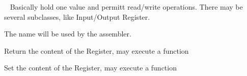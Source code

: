 \documentclass[letterpaper,10pt,english]{sphinxmanual}
\begin{document}
\begin{fulllineitems}
\label{core:py_register_machine2.core.parts.Register}~\label{core:register}
Basically hold one value and permitt read/write operations.
There may be several subclasses, like Input/Output Register.

The name will be used by the assembler.

\begin{fulllineitems}
\label{core:py_register_machine2.core.parts.Register.read}
Return the content of the Register,
may execute a function

\end{fulllineitems}


\begin{fulllineitems}
\label{core:py_register_machine2.core.parts.Register.write}
Set the content of the Register,
may execute a function

\end{fulllineitems}


\end{fulllineitems}

\end{document}
